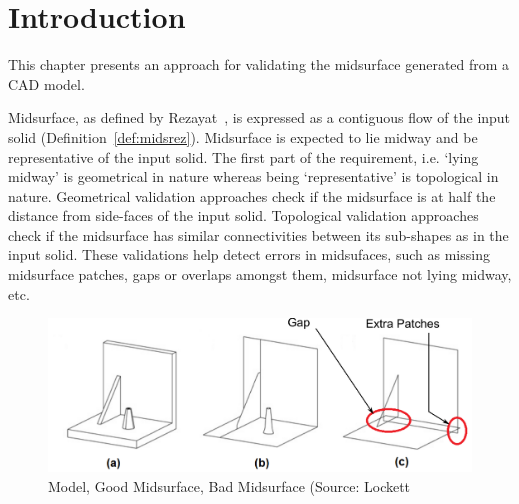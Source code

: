 

\section{Introduction}

This chapter presents an approach for validating the midsurface generated from a CAD model. %


Midsurface, as defined by Rezayat~\cite{Rezayat1996}, is expressed as a contiguous flow of the input solid (Definition~\ref{def:midsrez}). Midsurface is expected to lie midway and be representative of the input solid. The first part of the requirement, i.e. `lying midway' is geometrical in nature whereas being `representative' is topological in nature. Geometrical validation approaches check if the midsurface is at half the distance from side-faces of the input solid. Topological validation approaches check if the midsurface has similar connectivities between its sub-shapes as in the input solid. These validations help detect errors in midsufaces, such as missing midsurface patches, gaps or overlaps amongst them, midsurface not lying midway, etc.



\begin{figure}[!h]
\centering     %
\includegraphics[width=0.8\linewidth,valign=t]{images/midslocketterrors.pdf}
\caption{Model, Good Midsurface, Bad Midsurface (Source: Lockett~\cite{Lockett2008}}
\label{fig:litsurvey:midslocketterrors}
\end{figure}


